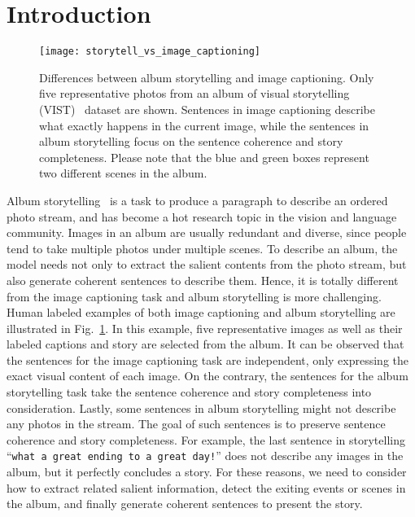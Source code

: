 \documentclass[letterpaper]{article} \usepackage{aaai19}  \usepackage{times}  \usepackage{helvet}  \usepackage{courier}  \usepackage{url}  \usepackage{graphicx}  \usepackage{color}
\begin{document}
\section{Introduction}
\begin{figure}
\centering
\texttt{[image: storytell\_vs\_image\_captioning]}
\caption{Differences between album storytelling and image captioning. Only five representative photos from an album of visual storytelling (VIST)~\cite{huang2016visual} dataset are shown. Sentences in image captioning describe what exactly happens in the current image, while the sentences in album storytelling focus on the sentence coherence and story completeness. Please note that the blue and green boxes represent two different scenes in the album.}
\label{fig:storytell_vs_image_captioning}
\end{figure}


Album storytelling~\cite{yu2017hierarchically,huang2016visual,liu2017video} is a task to  produce a paragraph to describe an ordered photo stream, and has become a hot research topic in the vision and language community. Images in an album are usually redundant and diverse, since people tend to take multiple photos under multiple scenes. To describe an album, the model needs not only to extract the salient contents from the photo stream, but also generate coherent sentences to describe them. Hence, it is totally different from the image captioning task and album storytelling is more challenging.
Human labeled examples of both image captioning and album storytelling are illustrated in Fig.~\ref{fig:storytell_vs_image_captioning}.
In this example, five representative images as well as their labeled captions and story are selected from the album.
It can be observed that the sentences for the image captioning task are independent, only expressing the exact visual content of each image.
On the contrary, the sentences for the album storytelling task take the sentence coherence and story completeness into consideration. Lastly, some sentences in album storytelling might not describe any photos in the stream. The goal of such sentences is to preserve sentence coherence and story completeness. For example, the last sentence in storytelling ``\texttt{what a great ending to a great day!}'' does not describe any images in the album, but it perfectly concludes a story.
For these reasons, we need to consider how to extract related salient information, detect the exiting events or scenes in the album, and finally generate coherent sentences to present the story.
\end{document}
